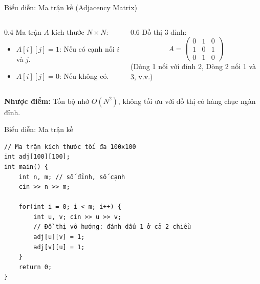 \begin{frame}{Biểu diễn: Ma trận kề (Adjacency Matrix)}
    \begin{columns}
        \begin{column}{0.4\textwidth}
            Ma trận $A$ kích thước $N \times N$:
            \begin{itemize}
                \item $A[i][j] = 1$: Nếu có cạnh nối $i$ và $j$.
                \item $A[i][j] = 0$: Nếu không có.
            \end{itemize}
        \end{column}
        \begin{column}{0.6\textwidth}
            \centering
            Đồ thị 3 đỉnh:
            \[
            A = \begin{pmatrix} 0 & 1 & 0 \\ 1 & 0 & 1 \\ 0 & 1 & 0 \end{pmatrix}
            \]
            \small (Dòng 1 nối với đỉnh 2, Dòng 2 nối 1 và 3, v.v.)
        \end{column}
    \end{columns}
    \textbf{Nhược điểm:} Tốn bộ nhớ $O(N^2)$, không tối ưu với đồ thị có hàng chục ngàn đỉnh.
\end{frame}

\begin{frame}[fragile]{Biểu diễn: Ma trận kề}
    \begin{verbatim}
// Ma trận kích thước tối đa 100x100
int adj[100][100]; 
int main() {
    int n, m; // số đỉnh, số cạnh
    cin >> n >> m;
    
    for(int i = 0; i < m; i++) {
        int u, v; cin >> u >> v;
        // Đồ thị vô hướng: đánh dấu 1 ở cả 2 chiều
        adj[u][v] = 1;
        adj[v][u] = 1;
    }
    return 0;
}
    \end{verbatim}
\end{frame}
